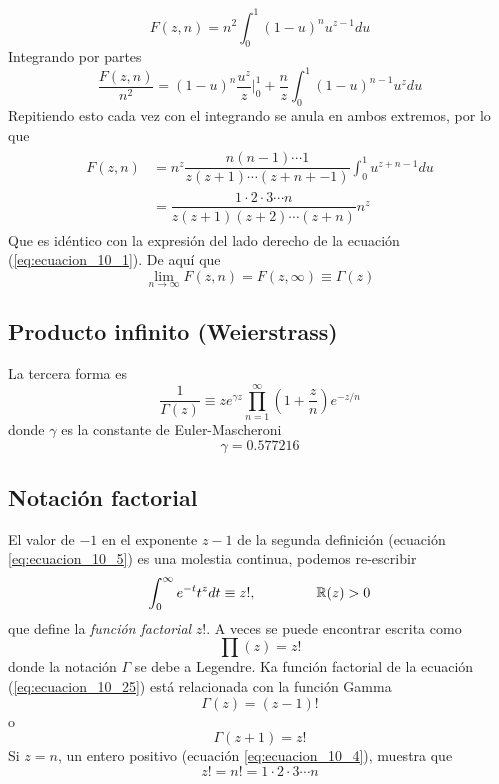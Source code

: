 \begin{equation}
F(z,n) = n^{2} \int_{0}^{1} (1-u)^{n} u^{z-1} du
\label{eq:ecuacione_10_12}
\end{equation}
Integrando por partes
\begin{equation}
\dfrac{F(z,n)}{n^{2}} =  (1-u)^{n} \dfrac{u^{z}}{z} \Bigg\vert_{0}^{1} + \dfrac{n}{z} \int_{0}^{1} (1-u)^{n-1} u^{z} du
\label{eq:ecuacion_10_13}
\end{equation}
Repitiendo esto cada vez con el integrando se anula en ambos extremos, por lo que
\begin{eqnarray}
\begin{aligned}
F(z,n) &= n^{z} \dfrac{n(n-1) \cdots 1}{z(z+1) \cdots (z+n+-1)} \int_{0}^{1} u^{z+n-1} du \\
&= \dfrac{1 \cdot 2 \cdot 3 \cdots n}{z(z+1)(z+2) \cdots (z+n)} n^{z}
\label{eq:ecuacion_10_14}
\end{aligned}
\end{eqnarray}
Que es idéntico con la expresión del lado derecho de la ecuación (\ref{eq:ecuacion_10_1}). De aquí que
\begin{equation}
\lim_{n \to \infty} F(z,n) = F(z,\infty) \equiv \Gamma (z)
\label{eq:ecuacion_10_15}
\end{equation}
\subsection{Producto infinito (Weierstrass)}
La tercera forma es
\begin{equation}
\dfrac{1}{\Gamma (z)} \equiv z e^{\gamma z} \prod_{n=1}^{\infty} \left( 1 + \dfrac{z}{n} \right) e^{-z/n}
\label{eq:ecuacion_10_16}
\end{equation}
donde $\gamma$ es la constante de Euler-Mascheroni
\begin{equation}
\gamma = 0.577216
\label{eq:ecuacion_10_17}
\end{equation}
\subsection{Notación factorial}
El valor de $-1$ en el exponente $z-1$ de la segunda definición (ecuación \ref{eq:ecuacion_10_5}) es una molestia continua, podemos re-escribir
\begin{equation}
\int_{0}^{\infty} e^{-t} t^{z} dt \equiv z!,  \hspace{1.5cm} \mathbb{R}(z) > 0
\label{eq:ecuacion_10_25}
\end{equation}
que define la \emph{función factorial} $z!$. A veces se puede encontrar escrita como
\begin{equation}
\prod(z) = z!
\end{equation}
donde la notación $\Gamma$ se debe a Legendre. Ka función factorial de la ecuación (\ref{eq:ecuacion_10_25}) está relacionada con la función Gamma
\[ \Gamma (z) = (z-1)! \]
o
\begin{equation}
\Gamma (z+1) = z!
\label{eq:ecuacion_10_27}
\end{equation}
Si $z=n$, un entero positivo (ecuación \ref{eq:ecuacion_10_4}), muestra que
\begin{equation}
z! = n! = 1 \cdot 2 \cdot 3 \cdots n
\label{eq:ecuacion_10_28}
\end{equation}

